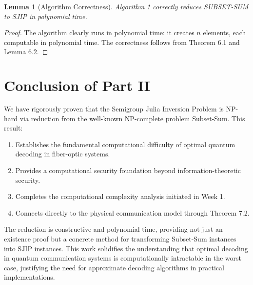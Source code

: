 \documentclass[12pt]{article}
\newtheorem{lemma}[theorem]{Lemma}
\begin{document}
\begin{lemma}[Algorithm Correctness]
Algorithm 1 correctly reduces SUBSET-SUM to SJIP in polynomial time.
\end{lemma}

\begin{proof}
The algorithm clearly runs in polynomial time: it creates $n$ elements, each computable in polynomial time. The correctness follows from Theorem 6.1 and Lemma 6.2.
\end{proof}

\section{Conclusion of Part II}
We have rigorously proven that the Semigroup Julia Inversion Problem is NP-hard via reduction from the well-known NP-complete problem Subset-Sum. This result:
\begin{enumerate}
\item Establishes the fundamental computational difficulty of optimal quantum decoding in fiber-optic systems.
\item Provides a computational security foundation beyond information-theoretic security.
\item Completes the computational complexity analysis initiated in Week 1.
\item Connects directly to the physical communication model through Theorem 7.2.
\end{enumerate}
The reduction is constructive and polynomial-time, providing not just an existence proof but a concrete method for transforming Subset-Sum instances into SJIP instances. This work solidifies the understanding that optimal decoding in quantum communication systems is computationally intractable in the worst case, justifying the need for approximate decoding algorithms in practical implementations.
\end{document}
